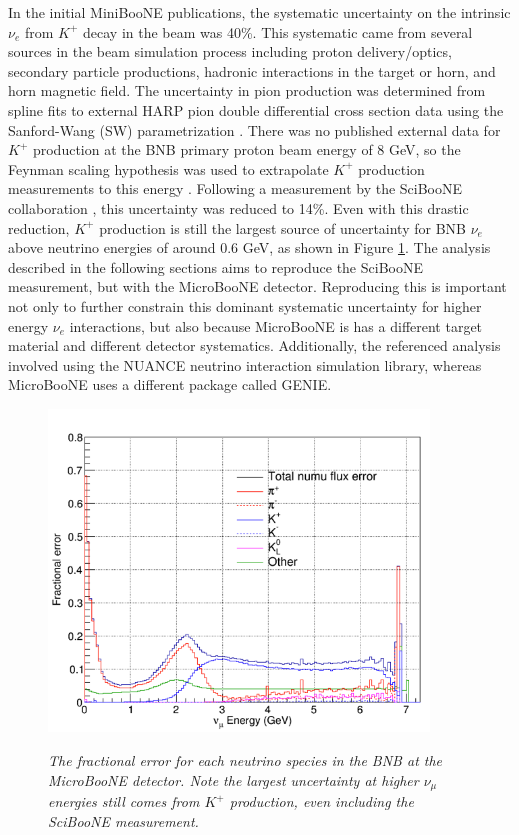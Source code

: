 In the initial MiniBooNE publications, the systematic uncertainty on the intrinsic $\nu_e$ from $K^+$ decay in the beam was 40\%. This systematic came from several sources in the beam simulation process including proton delivery/optics, secondary particle productions, hadronic interactions in the target or horn, and horn magnetic field. The uncertainty in pion production was determined from spline fits to external HARP pion double differential cross section data using the Sanford-Wang (SW) parametrization \cite{SanfordWangGary7} \cite{HARPgary8}. There was no published external data for $K^+$ production at the BNB primary proton beam energy of 8 GeV, so the Feynman scaling hypothesis was used to extrapolate $K^+$ production measurements to this energy \cite{FEYNMANgary6}. Following a measurement by the SciBooNE collaboration \cite{gary_kaon_production_paper}, this uncertainty was reduced to 14\%. Even with this drastic reduction, $K^+$ production is still the largest source of uncertainty for BNB $\nu_e$ above neutrino energies of around 0.6 GeV, as shown in Figure \ref{UB_nue_fluxerror_fig}. The analysis described in the following sections aims to reproduce the SciBooNE measurement, but with the MicroBooNE detector. Reproducing this is important not only to further constrain this dominant systematic uncertainty for higher energy $\nu_e$ interactions, but also because MicroBooNE is has a different target material and different detector systematics. Additionally, the referenced analysis involved using the NUANCE neutrino interaction simulation library, whereas MicroBooNE uses a different package called GENIE.

\begin{figure}[ht!]
\centering
	\includegraphics[width=0.9\textwidth]{Figures/UB_nue_fluxerror.png} \\
\caption{\textit{The fractional error for each neutrino species in the BNB at the MicroBooNE detector. Note the largest uncertainty at higher $\nu_\mu$ energies still comes from $K^+$ production, even including the SciBooNE measurement.}}\label{UB_nue_fluxerror_fig}
\end{figure}


